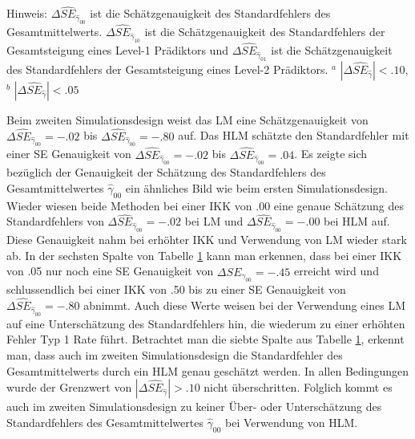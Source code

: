 \documentclass[12pt]{article}\usepackage[]{graphicx}\usepackage[]{color}
\begin{document}
\begin{table}[t!]
\begin{threeparttable}
\begin{tabular}{lcccccccc}
\bottomrule
\end{tabular}
\label{tab:study1_results}
\begin{tablenotes}[flushleft]
\footnotesize
\item Hinweis: $\Delta\widehat{SE}_{\widehat{\gamma}_{00}}$ ist die Schätzgenauigkeit des Standardfehlers des Gesamtmittelwerts. $\Delta\widehat{SE}_{\widehat{\gamma}_{10}}$ ist die Schätzgenauigkeit des Standardfehlers der Gesamtsteigung eines Level-1 Prädiktors und $\Delta\widehat{SE}_{\widehat{\gamma}_{01}}$ ist die Schätzgenauigkeit des Standardfehlers der Gesamtsteigung eines Level-2 Prädiktors. $^a$ $|\Delta\widehat{SE}_{\widehat{\gamma}}| < .10$, $^b$ $|\Delta\widehat{SE}_{\widehat{\gamma}}| < .05$
\end{tablenotes}
\end{threeparttable}
\end{table}

Beim zweiten Simulationsdesign weist das LM eine Schätzgenauigkeit von $\Delta\widehat{SE}_{\widehat{\gamma}_{00}} = -.02$ bis $\Delta\widehat{SE}_{\widehat{\gamma}_{00}} = -.80$ auf. Das HLM schätzte den Standardfehler mit einer SE Genauigkeit von $\Delta\widehat{SE}_{\widehat{\gamma}_{00}} = -.02$ bis $\Delta\widehat{SE}_{\widehat{\gamma}_{00}} = .04$. Es zeigte sich bezüglich der Genauigkeit der Schätzung des Standardfehlers des Gesamtmittelwertes $\widehat{\gamma}_{00}$ ein ähnliches Bild wie beim ersten Simulationsdesign. Wieder wiesen beide Methoden bei einer IKK von .00 eine genaue Schätzung des Standardfehlers von $\Delta\widehat{SE}_{\widehat{\gamma}_{00}} = -.02$ bei LM und $\Delta\widehat{SE}_{\widehat{\gamma}_{00}} = -.00$ bei HLM auf. Diese Genauigkeit nahm bei erhöhter IKK und Verwendung von LM wieder stark ab. In der sechsten Spalte von Tabelle \ref{tab:study1_results} kann man erkennen, dass bei einer IKK von .05 nur noch eine SE Genauigkeit von $\Delta\widehat{SE}_{\widehat{\gamma}_{00}} = -.45$ erreicht wird und schlussendlich bei einer IKK von .50 bis zu einer SE Genauigkeit von $\Delta\widehat{SE}_{\widehat{\gamma}_{00}} = -.80$ abnimmt. Auch diese Werte weisen bei der Verwendung eines LM auf eine Unterschätzung des Standardfehlers hin, die wiederum zu einer erhöhten Fehler Typ 1 Rate führt. Betrachtet man die siebte Spalte aus Tabelle \ref{tab:study1_results}, erkennt man, dass auch im zweiten Simulationsdesign die Standardfehler des Gesamtmittelwerts durch ein HLM genau geschätzt werden. In allen Bedingungen wurde der Grenzwert von $|\Delta\widehat{SE}_{\widehat{\gamma}}| > .10$ nicht überschritten. Folglich kommt es auch im zweiten Simulationsdesign zu keiner Über- oder Unterschätzung des Standardfehlers des Gesamtmittelwertes $\widehat{\gamma}_{00}$ bei Verwendung von HLM.
\end{document}
